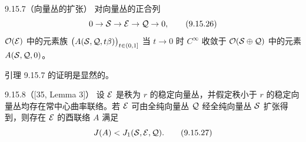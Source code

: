 \begin{lemma}{9.15.7（向量丛的扩张）}
  对向量丛的正合列
  \begin{equation}
    0\to\mathcal{S}\to\mathcal{E}\to\mathcal{Q}\to0,
    \tag{9.15.26}
  \end{equation}
  $\mathcal{O}(\mathcal{E})$ 中的元素族 $\bigl(A(\mathcal{S},\mathcal{Q},t\beta)\bigr)_{t\in(0,1]}$ 当 $t\to0$ 时 $C^\infty$ 收敛于 $\mathcal{O}(\mathcal{S}\oplus\mathcal{Q})$ 中的元素 $A(\mathcal{S},\mathcal{Q},0)$。
\end{lemma}

引理 9.15.7 的证明是显然的。

\begin{lemma*}{9.15.8（[35, Lemma 3]）}
  设 $\mathcal{E}$ 是秩为 $r$ 的稳定向量丛，并假定秩小于 $r$ 的稳定向量丛均存在常中心曲率联络。若 $\mathcal{E}$ 可由全纯向量丛 $\mathcal{Q}$ 经全纯向量丛 $\mathcal{S}$ 扩张得到，则存在 $\mathcal{E}$ 的酉联络 $A$ 满足
  \begin{equation}
    J(A)<J_1(\mathcal{S},\mathcal{E},\mathcal{Q}).
    \tag{9.15.27}
  \end{equation}
\end{lemma*}
